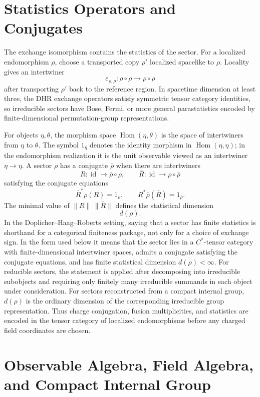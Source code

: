 \section{Statistics Operators and Conjugates}

The exchange isomorphism contains the statistics of the sector.  For a
localized endomorphism \(\rho\), choose a transported copy
\(\rho'\) localized spacelike to \(\rho\).  Locality gives an intertwiner
\[
  \varepsilon_{\rho,\rho}:\rho\circ\rho\to\rho\circ\rho
\]
after transporting \(\rho'\) back to the reference region.  In spacetime
dimension at least three, the DHR exchange operators satisfy symmetric tensor
category identities, so irreducible sectors have Bose, Fermi, or more general
parastatistics encoded by finite-dimensional permutation-group
representations.

For objects \(\eta,\theta\), the morphism space
\(\operatorname{Hom}(\eta,\theta)\) is the space of intertwiners from
\(\eta\) to \(\theta\).  The symbol \(1_\eta\) denotes the identity morphism in
\(\operatorname{Hom}(\eta,\eta)\); in the endomorphism realization it is the
unit observable viewed as an intertwiner \(\eta\to\eta\).  A sector \(\rho\)
has a conjugate \(\bar\rho\) when there are intertwiners
\[
  R:\operatorname{id}\to \bar\rho\circ\rho,
  \qquad
  \bar R:\operatorname{id}\to \rho\circ\bar\rho
\]
satisfying the conjugate equations
\[
  \bar R^*\rho(R)=1_\rho,
  \qquad
  R^*\bar\rho(\bar R)=1_{\bar\rho}.
\]
The minimal value of \(\|R\|\,\|\bar R\|\) defines the statistical dimension
\[
  d(\rho).
\]
In the Doplicher--Haag--Roberts setting, saying that a sector has finite
statistics is shorthand for a categorical finiteness package, not only for a
choice of exchange sign.  In the form used below it means that the sector lies
in a \(C^*\)-tensor category with finite-dimensional intertwiner spaces, admits
a conjugate satisfying the conjugate equations, and has finite statistical
dimension \(d(\rho)<\infty\).  For reducible sectors, the statement is applied
after decomposing into irreducible subobjects and requiring only finitely many
irreducible summands in each object under consideration.
For sectors reconstructed from a compact internal group, \(d(\rho)\) is the
ordinary dimension of the corresponding irreducible group representation.
Thus charge conjugation, fusion multiplicities, and statistics are encoded in
the tensor category of localized endomorphisms before any charged field
coordinates are chosen.

\section{Observable Algebra, Field Algebra, and Compact Internal Group}

